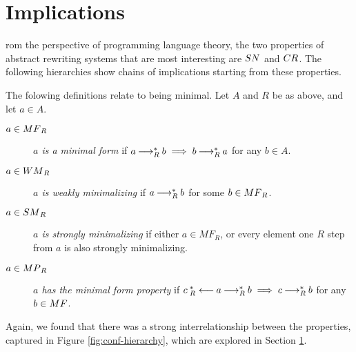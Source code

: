 \section{Implications}
\label{sec:Implications}

\newenvironment{counterexample}[1][]{%
    \refstepcounter{CEcounter} %
    \noindent \scriptsize\textbf{{\theCEcounter } }  #1\par
}

From the perspective of programming language theory, the two properties of abstract rewriting 
systems that are most interesting are $\SN$ and $\CR$. The following hierarchies 
show chains of implications starting from these properties.

\begin{definition} The folowing definitions relate to being minimal. Let $A$ and $R$ be as above, and let $a \in A$.
    \begin{description}
        \item[$a \in \MF_R$] \emph{$a$ is a minimal form} if $a \mathbin{\longrightarrow_R^*} b \implies b \mathbin{\longrightarrow_R^*} a$ for any $b \in A$.
        \item[$a \in \WM_R$] \emph{$a$ is weakly minimalizing} if $a \mathbin{\longrightarrow_R^*} b$ for some $b \in \MF_R$.
        \item[$a \in \SM_R$]  \emph{$a$ is strongly minimalizing} if either $a \in MF_R$, or every element one $R$ step from $a$ is also strongly minimalizing.
        \item[$a \in \MP_R$] \emph{$a$ has the minimal form property} if $c \mathbin{_R^*\longleftarrow} a \mathbin{\longrightarrow_R^*} b \implies c \mathbin{\longrightarrow_R^*} b$ for any $b \in \MF$.

    \end{description}
\end{definition}

Again, we found that there was a strong interrelationship between the properties, captured in Figure \ref{fig:conf-hierarchy}, which are explored in Section \ref{sec:Implications}.

